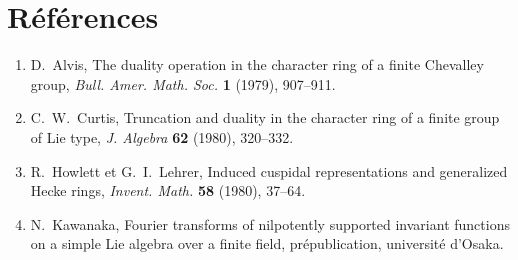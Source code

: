 \documentclass[10pt,a4paper]{article}
\theoremstyle{plain}
\theoremstyle{definition}
\theoremstyle{remark}
\begin{document}
\newpage
\section*{Références}

\begin{enumerate}[label=\arabic*., leftmargin=*, itemsep=2pt]
\item D.~Alvis, The duality operation in the character ring of a finite Chevalley group, \textit{Bull. Amer. Math. Soc.} \textbf{1} (1979), 907--911.
\item C.~W.~Curtis, Truncation and duality in the character ring of a finite group of Lie type, \textit{J. Algebra} \textbf{62} (1980), 320--332.
\item R.~Howlett et G.~I.~Lehrer, Induced cuspidal representations and generalized Hecke rings, \textit{Invent. Math.} \textbf{58} (1980), 37--64.
\item N.~Kawanaka, Fourier transforms of nilpotently supported invariant functions on a simple Lie algebra over a finite field, prépublication, université d'Osaka.
\end{enumerate}
\end{document}
